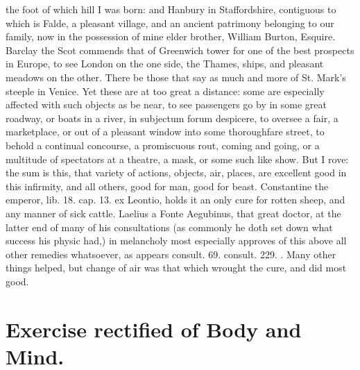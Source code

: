 {the foot of which hill I was born: and Hanbury in Staffordshire,
contiguous to which is Falde, a pleasant village, and an ancient
patrimony belonging to our family, now in the possession of mine elder
brother, William Burton, Esquire. Barclay the Scot commends that
of Greenwich tower for one of the best prospects in Europe, to see
London on the one side, the Thames, ships, and pleasant meadows on the
other. There be those that say as much and more of St. Mark's steeple
in Venice. Yet these are at too great a distance: some are especially
affected with such objects as be near, to see passengers go by in some
great roadway, or boats in a river, in subjectum forum despicere, to
oversee a fair, a marketplace, or out of a pleasant window into some
thoroughfare street, to behold a continual concourse, a promiscuous
rout, coming and going, or a multitude of spectators at a theatre, a
mask, or some such like show. But I rove: the sum is this, that variety
of actions, objects, air, places, are excellent good in this infirmity,
and all others, good for man, good for beast. Constantine the
emperor, lib. 18. cap. 13. ex Leontio, holds it an only cure for rotten
sheep, and any manner of sick cattle. Laelius a Fonte Aegubinus, that
great doctor, at the latter end of many of his consultations (as
commonly he doth set down what success his physic had,) in melancholy
most especially approves of this above all other remedies whatsoever,
as appears consult. 69. consult. 229. \etc{}. Many other things
helped, but change of air was that which wrought the cure, and did most
good.


\section{Exercise rectified of Body and Mind.}

}

